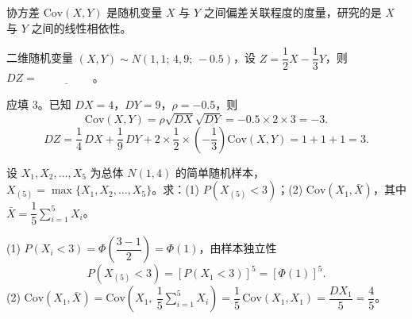 \documentclass[lang=cn,11pt]{elegantbook}
\begin{document}
\begin{note}
协方差 \(\mathrm{Cov}(X,Y)\) 是随机变量 \(X\) 与 \(Y\) 之间偏差关联程度的度量，研究的是 \(X\) 与 \(Y\) 之间的线性相依性。
\end{note}

\begin{exercise}\label{exer:4-bvn-dz}
二维随机变量 \((X,Y) \sim N(1,1;\,4,9;\,-0.5)\)，设 \(Z = \dfrac{1}{2}X - \dfrac{1}{3}Y\)，则 \(DZ =\,\underline{\hspace{2cm}}\)。
\end{exercise}
\begin{solution}
应填 3。已知 \(DX = 4\)，\(DY = 9\)，\(\rho = -0.5\)，则
\[
\mathrm{Cov}(X,Y) = \rho\sqrt{DX}\sqrt{DY} = -0.5 \times 2 \times 3 = -3.
\]
\[
DZ = \frac{1}{4}\,DX + \frac{1}{9}\,DY + 2 \times \frac{1}{2} \times \left(-\frac{1}{3}\right) \mathrm{Cov}(X,Y)
= 1 + 1 + 1 = 3.
\]
\end{solution}

\begin{exercise}\label{exer:4-sample-cov}
设 \(X_1, X_2, \dots, X_5\) 为总体 \(N(1,4)\) 的简单随机样本，\(X_{(5)} = \max\{X_1, X_2, \dots, X_5\}\)。求：(1) \(P(X_{(5)} < 3)\)；(2) \(\mathrm{Cov}(X_1, \bar{X})\)，其中 \(\bar{X} = \dfrac{1}{5}\sum\limits_{i=1}^{5}X_i\)。
\end{exercise}
\begin{solution}
(1) \(P(X_i < 3) = \Phi\!\left(\dfrac{3-1}{2}\right) = \Phi(1)\)，由样本独立性
\[
P(X_{(5)} < 3) = [P(X_1 < 3)]^5 = [\Phi(1)]^5.
\]
(2) \(\mathrm{Cov}(X_1, \bar{X}) = \mathrm{Cov}\!\left(X_1,\ \dfrac{1}{5}\sum_{i=1}^{5}X_i\right) = \dfrac{1}{5}\,\mathrm{Cov}(X_1, X_1) = \dfrac{DX_1}{5} = \dfrac{4}{5}\)。
\end{solution}
\end{document}
